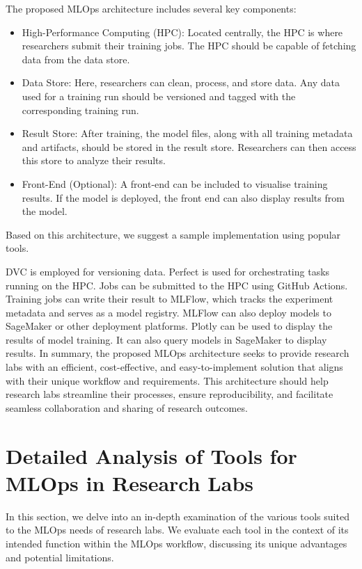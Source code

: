 The proposed MLOps architecture includes several key components:

\begin{itemize}
    \item High-Performance Computing (HPC): Located centrally, the HPC is where researchers submit their training jobs. The HPC should be capable of fetching data from the data store.
    \item Data Store: Here, researchers can clean, process, and store data. Any data used for a training run should be versioned and tagged with the corresponding training run.
    \item Result Store: After training, the model files, along with all training metadata and artifacts, should be stored in the result store. Researchers can then access this store to analyze their results.
    \item Front-End (Optional): A front-end can be included to visualise training results. If the model is deployed, the front end can also display results from the model.
\end{itemize}

Based on this architecture, we suggest a sample implementation using popular tools.

DVC is employed for versioning data.
Perfect is used for orchestrating tasks running on the HPC.
Jobs can be submitted to the HPC using GitHub Actions.
Training jobs can write their result to MLFlow, which tracks the experiment metadata and serves as a model registry.
MLFlow can also deploy models to SageMaker or other deployment platforms.
Plotly can be used to display the results of model training. It can also query models in SageMaker to display results.
In summary, the proposed MLOps architecture seeks to provide research labs with an efficient, cost-effective, and easy-to-implement solution that aligns with their unique workflow and requirements. This architecture should help research labs streamline their processes, ensure reproducibility, and facilitate seamless collaboration and sharing of research outcomes.

\section{Detailed Analysis of Tools for MLOps in Research Labs \label{analysis}}
In this section, we delve into an in-depth examination of the various tools suited to the MLOps needs of research labs. We evaluate each tool in the context of its intended function within the MLOps workflow, discussing its unique advantages and potential limitations.

